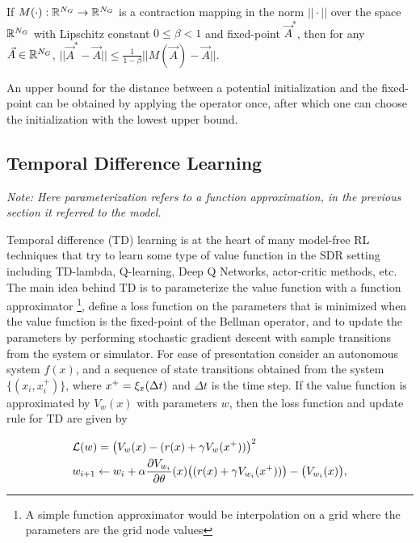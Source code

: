 \begin{proposition} If $M(\cdot): \mathbb{R}^{N_G} \rightarrow \mathbb{R}^{N_G}$ is a contraction mapping in the norm $|| \cdot ||$ over the space $\mathbb{R}^{N_G}$ with Lipschitz constant $0\leq \beta < 1$ and fixed-point $\vec{A}^*$, then for any $\vec{A} \in \mathbb{R}^{N_G}$,  $||\vec{A}^* - \vec{A}|| \leq \frac{1}{1-\beta}||M(\vec{A}) - \vec{A}||$. 
\end{proposition}

An upper bound for the distance between a potential initialization and the fixed-point can be obtained by applying the operator once, after which one can choose the initialization with the lowest upper bound.

\subsection{Temporal Difference Learning}

\emph{Note: Here parameterization refers to a function approximation, in the previous section it referred to the model.}

Temporal difference (TD) learning is at the heart of many model-free RL techniques that try to learn some type of value function in the SDR setting including TD-lambda, Q-learning, Deep Q Networks, actor-critic methods, etc. The main idea behind TD is to parameterize the value function with a function approximator \footnote{A simple function approximator would be interpolation on a grid where the parameters are the grid node values}, define a loss function on the parameters that is minimized when the value function is the fixed-point of the Bellman operator, and to update the parameters by performing stochastic gradient descent with sample transitions from the system or simulator. For ease of presentation consider an autonomous system $f(x)$, and a sequence of state transitions obtained from the system $\{(x_i,x_i^+)\}$, where $x^+=\xi_x(\Delta t)$ and $\Delta t$ is the time step. If the value function is approximated by $V_w(x)$ with parameters $w$, then the loss function and update rule for TD are given by

\begin{equation}
\begin{split}
&\mathcal{L}(w)=\big(V_{w}(x) - (r(x)+\gamma V_{w}(x^+))\big)^2\\
&w_{i+1} \leftarrow w_i + \alpha\frac{\partial V_{w_i}}{\partial \theta}(x)\big((r(x)+\gamma V_{w_i}(x^+))\big)- \big(V_{w_i}(x)\big),
\end{split}
\end{equation}

